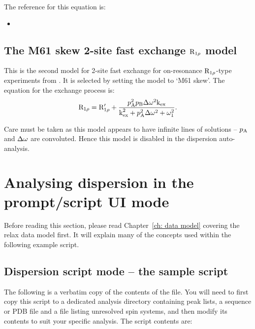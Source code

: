 The reference for this equation is:
\begin{itemize}
\item {}
\end{itemize}



\subsection{The M61 skew 2-site fast exchange $\mathrm{R}_{1\rho}$ model}
\label{sect: dispersion: M61 skew model}

This is the second model for 2-site fast exchange for on-resonance $\mathrm{R}_{1\rho}$-type experiments from \citet{Meiboom61}.  It is selected by setting the model to `M61 skew'.  The equation for the exchange process is:
\begin{equation}
    \mathrm{R}_{1\rho} = \mathrm{R}_{1\rho}' + \frac{p_\textrm{A}^2p_\textrm{B}\Delta\omega^2\textrm{k}_\textrm{ex}}{\textrm{k}_\textrm{ex}^2 + p_\textrm{A}^2\Delta\omega^2 + \omega_1^2} .
\end{equation}

Care must be taken as this model appears to have infinite lines of solutions -- $p_\textrm{A}$ and $\Delta\omega$ are convoluted.  Hence this model is disabled in the dispersion auto-analysis.



\section{Analysing dispersion in the prompt/script UI mode}

Before reading this section, please read Chapter~\ref{ch: data model} covering the relax data model first.  It will explain many of the concepts used within the following example script.



\subsection{Dispersion script mode -- the sample script}

The following is a verbatim copy of the contents of the  file.
You will need to first copy this script to a dedicated analysis directory containing peak lists, a sequence or PDB file and a file listing unresolved spin systems, and then modify its contents to suit your specific analysis.
The script contents are:

